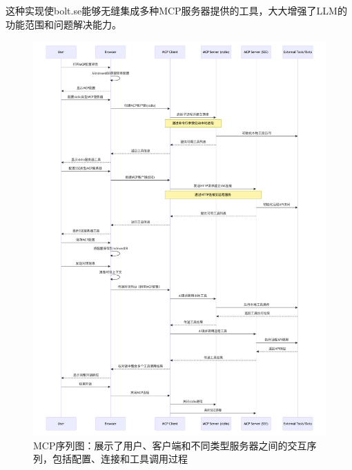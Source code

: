 这种实现使bolt.se能够无缝集成多种MCP服务器提供的工具，大大增强了LLM的功能范围和问题解决能力。

\begin{figure}[htbp]
  \centering
  \includegraphics[width=\textwidth]{figures/mcp_sequence.pdf}
  \caption{MCP序列图：展示了用户、客户端和不同类型服务器之间的交互序列，包括配置、连接和工具调用过程}
  \label{fig:mcp_sequence}
\end{figure}


    
    
